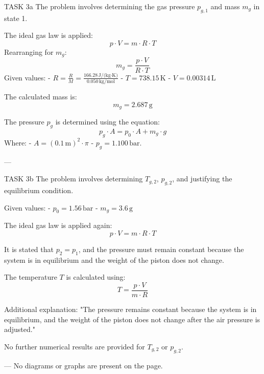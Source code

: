 TASK 3a  
The problem involves determining the gas pressure \( p_{g,1} \) and mass \( m_g \) in state 1.  

The ideal gas law is applied:  
\[
p \cdot V = m \cdot R \cdot T
\]  
Rearranging for \( m_g \):  
\[
m_g = \frac{p \cdot V}{R \cdot T}
\]  
Given values:  
- \( R = \frac{R}{M} = \frac{166.28 \, \text{J/(kg·K)}}{0.050 \, \text{kg/mol}} \)  
- \( T = 738.15 \, \text{K} \)  
- \( V = 0.00314 \, \text{L} \)  

The calculated mass is:  
\[
m_g = 2.687 \, \text{g}
\]  

The pressure \( p_g \) is determined using the equation:  
\[
p_g \cdot A = p_0 \cdot A + m_g \cdot g
\]  
Where:  
- \( A = (0.1 \, \text{m})^2 \cdot \pi \)  
- \( p_g = 1.100 \, \text{bar} \).  

---

TASK 3b  
The problem involves determining \( T_{g,2} \), \( p_{g,2} \), and justifying the equilibrium condition.  

Given values:  
- \( p_0 = 1.56 \, \text{bar} \)  
- \( m_g = 3.6 \, \text{g} \)  

The ideal gas law is applied again:  
\[
p \cdot V = m \cdot R \cdot T
\]  

It is stated that \( p_2 = p_1 \), and the pressure must remain constant because the system is in equilibrium and the weight of the piston does not change.  

The temperature \( T \) is calculated using:  
\[
T = \frac{p \cdot V}{m \cdot R}
\]  

Additional explanation: "The pressure remains constant because the system is in equilibrium, and the weight of the piston does not change after the air pressure is adjusted."  

No further numerical results are provided for \( T_{g,2} \) or \( p_{g,2} \).  

---  
No diagrams or graphs are present on the page.